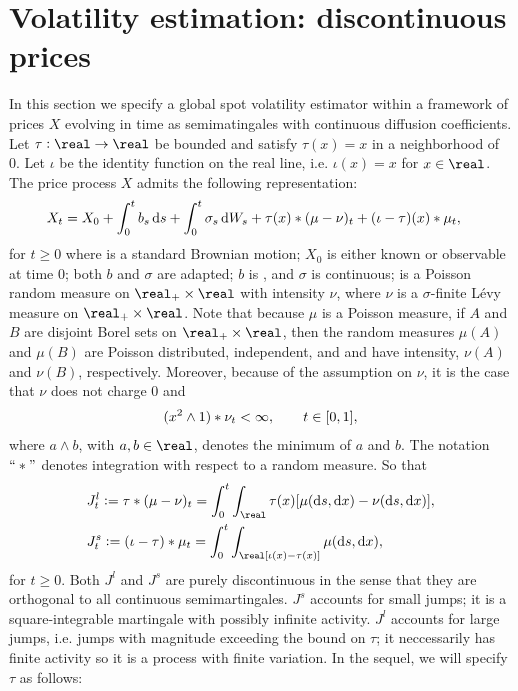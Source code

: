 \section{Volatility estimation: discontinuous prices} 
In this section we specify a global spot volatility estimator within a framework of prices $X$ evolving in time as \ito semimatingales with continuous diffusion coefficients. 
 Let $\tau: \real \to \real$ be bounded and satisfy $\tau(x) = x$ in a neighborhood of 0.  Let $\iota$ be the identity  function on the real line, i.e.  $\iota(x) = x$ for $x \in \real$. The price process $X$ admits the following  representation:
\begin{align}
  X_t & = X_0 + \int_0^t b_s \D s + \int_0^t \sigma_s \D W_s +  \tau(x)\ast (\pme  - \nu)_t  + (\iota - \tau)(x)\ast \pme_t ,   
  \label{eq:generalsemimartingale}
\end{align}
for $t \ge 0$  where  \sbm is a standard Brownian motion;  $X_0$ is either known or observable at time 0;  both $b$ and $\sigma$ are adapted; $b$ is \cadlag, and $\sigma$ is continuous;  \pme is a Poisson random measure on $\real_+ \times \real$ with intensity $\nu$, where $\nu$ is a  $\sigma$-finite L\'evy  measure on $\real_+ \times \real$. Note that because $\mu$ is a Poisson measure, if $A$ and $B$ are disjoint Borel sets on $\real_+ \times \real$, then the random measures $\mu(A)$ and $\mu(B)$ are Poisson distributed, independent, and  and have intensity, $\nu(A)$ and $\nu(B)$, respectively. Moreover, because of the \levy assumption on $\nu$, it is the case that $\nu$ does not charge 0 and 
\begin{align}
  (x^2 \wedge 1) \ast\nu_t < \infty, \qquad t \in [0,1],\notag
  \label{}
\end{align}
where $a \wedge b$, with  $a,b \in \real$, denotes the minimum of $a$ and $b$. The  notation $``\ast"$ denotes integration with respect to a random measure. So that 
\begin{align}
  &J_{t}^l :=  \tau\ast (\pme  - \nu)_t = \int_0^t\int_\real \tau(x) [\pme(\D s, \D x)   -  \nu(\D s,\D x)], \notag\\
  & J_{t}^s:= (\iota - \tau)\ast \pme_t = \int_0^t\int_\real [\iota(x) - \tau(x)] \pme(\D s, \D x), \notag
  \label{}
\end{align}
for $t \ge 0$. Both  $J^l$ and $J^s$ are purely discontinuous in the sense that they are orthogonal to all continuous semimartingales. $J^s$ accounts for  small jumps; it is a square-integrable martingale with possibly infinite activity. $J^l$ accounts for large jumps, i.e. jumps with magnitude exceeding the bound on $\tau$; it neccessarily has finite activity so it is a process with finite variation. In the sequel, we will specify $\tau$ as follows:
